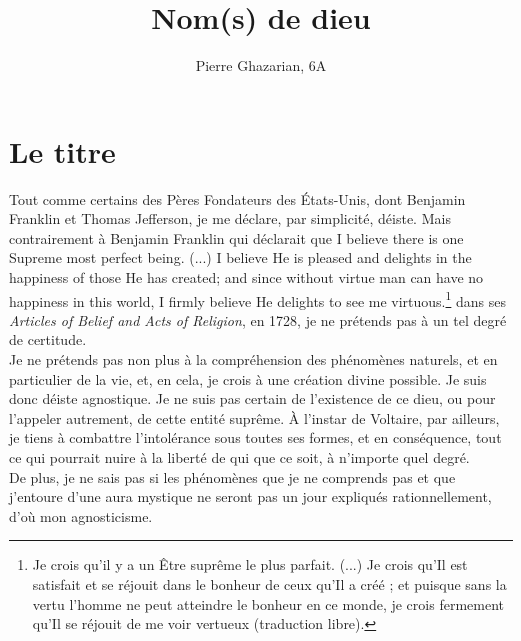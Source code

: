 \documentclass[12pt,a4paper]{article}
\author{Pierre Ghazarian, 6A}
\title{Nom(s) de dieu}
\begin{document}
\maketitle


\part{Le titre}

Tout comme certains des \og{}Pères Fondateurs\fg{} des États-Unis, dont Benjamin Franklin et Thomas Jefferson,  je me déclare, par simplicité, déiste. Mais contrairement à Benjamin Franklin qui déclarait que {\og{}I believe there is one Supreme most perfect being. (...) I believe He is pleased and delights in the happiness of those He has created; and since without virtue man can have no happiness in this world, I firmly believe He delights to see me virtuous.\fg{}\footnote{Je crois qu'il y a un Être suprême le plus parfait. (...) Je crois qu'Il est satisfait et se réjouit dans le bonheur de ceux qu'Il a créé ; et puisque sans la vertu l'homme ne peut atteindre le bonheur en ce monde, je crois fermement qu'Il se réjouit de me voir vertueux (traduction libre).}  dans ses \emph{Articles of Belief and Acts of Religion}, en 1728, je ne prétends pas à un tel degré de certitude.\\ 

Je ne prétends pas non plus à la compréhension des phénomènes naturels, et en particulier de la vie, et, en cela, je crois à une création divine possible. Je suis donc déiste agnostique. Je ne suis pas certain de l'existence de ce dieu, ou pour l'appeler autrement, de cette entité suprême. À l'instar de Voltaire, par ailleurs, je tiens à combattre l'intolérance sous toutes ses formes, et en conséquence, tout ce qui pourrait nuire à la liberté de qui que ce soit, à n'importe quel degré.\\

De plus, je ne sais pas si les phénomènes que je ne comprends pas et que j'entoure d'une aura mystique ne seront pas un jour expliqués rationnellement, d'où mon agnosticisme.\\

}
\end{document}
